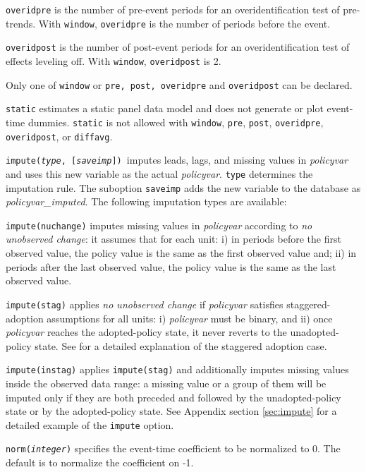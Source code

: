 \documentclass[12pt]{article}
\begin{document}
\morehangpara
{\tt overidpre} is the number of pre-event periods for an overidentification test of pre-trends. With {\tt window}, {\tt overidpre} is the number of periods before the event.

\morehangpara
{\tt overidpost} is the number of post-event periods for an overidentification test of effects leveling off. With {\tt window}, {\tt overidpost} is 2.

\hangpara
Only one of {\tt window} or {\tt pre, post, overidpre} and {\tt overidpost} can be declared.

\hangpara
{\tt static} estimates a static panel data model and does not generate or plot event-time dummies.
{\tt static} is not allowed with {\tt window}, {\tt pre}, {\tt post}, {\tt overidpre}, {\tt overidpost}, or {\tt diffavg}.

\hangpara
{\tt impute({\it type}, [{\it saveimp}]) }imputes leads, lags, and missing values in {\it policyvar} and uses this new variable as the actual {\it policyvar}.
{\tt type} determines the imputation rule. The suboption {\tt saveimp} adds the new variable to the database as {\it policyvar\_imputed}.
The following imputation types are available:

\morehangpara
{\tt impute(nuchange)} imputes missing values in {\it policyvar} according to {\it no unobserved change}: it assumes that for each unit: i) in periods before the first observed value, the policy value is the same as the first observed value and; ii) in periods after the last observed value, the policy value is the same as the last observed value.

\morehangpara
{\tt impute(stag)} applies {\it no unobserved change} if {\it policyvar} satisfies staggered-adoption assumptions for all units: i) {\it policyvar} must be binary, and ii) once {\it policyvar} reaches the adopted-policy state, it never reverts to the unadopted-policy state.
See \citet{freyaldenhoven2021visualizationforth} for a detailed explanation of the staggered adoption case.

\morehangpara
{\tt impute(instag)} applies {\tt impute(stag)} and additionally imputes missing values inside the observed data range: a missing value or a group of them will be imputed only if they are both preceded and followed by the unadopted-policy state or by the adopted-policy state.
See Appendix section \ref{sec:impute} for a detailed example of the {\tt impute} option.

\hangpara
{\tt norm({\it integer})} specifies the event-time coefficient to be normalized to 0. The default is to normalize the coefficient on -1.
\end{document}
